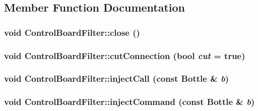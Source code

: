 \subsection{Member Function Documentation}
\hypertarget{classyarp_1_1os_1_1_control_board_filter_a6224733f849144002f5b0f89f30ffb17}{
\subsubsection[{close}]{\setlength{\rightskip}{0pt plus 5cm}void ControlBoardFilter::close ()}}
\label{classyarp_1_1os_1_1_control_board_filter_a6224733f849144002f5b0f89f30ffb17}
\hypertarget{classyarp_1_1os_1_1_control_board_filter_a97baafa3310ec3ecad9c348c29c8b09c}{
\subsubsection[{cutConnection}]{\setlength{\rightskip}{0pt plus 5cm}void ControlBoardFilter::cutConnection (bool {\em cut} = {\ttfamily true})}}
\label{classyarp_1_1os_1_1_control_board_filter_a97baafa3310ec3ecad9c348c29c8b09c}
\hypertarget{classyarp_1_1os_1_1_control_board_filter_a46da5eabf941da5694107bf2d4adc075}{
\subsubsection[{injectCall}]{\setlength{\rightskip}{0pt plus 5cm}void ControlBoardFilter::injectCall (const Bottle \& {\em b})}}
\label{classyarp_1_1os_1_1_control_board_filter_a46da5eabf941da5694107bf2d4adc075}
\hypertarget{classyarp_1_1os_1_1_control_board_filter_a329bcebdddb5afbd7a5e7303e6941311}{
\subsubsection[{injectCommand}]{\setlength{\rightskip}{0pt plus 5cm}void ControlBoardFilter::injectCommand (const Bottle \& {\em b})}}
